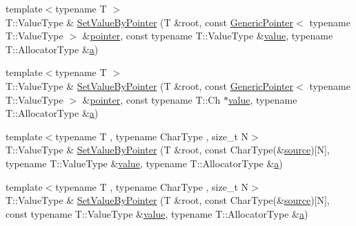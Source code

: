 \begin{DoxyCompactItemize}
\item 
{\footnotesize template$<$typename T $>$ }\\T\+::\+Value\+Type \& \mbox{\hyperlink{namespacerapidjson_a0cd01a20b4256bd943f02fe255e7cc32}{Set\+Value\+By\+Pointer}} (T \&root, const \mbox{\hyperlink{classrapidjson_1_1_generic_pointer}{Generic\+Pointer}}$<$ typename T\+::\+Value\+Type $>$ \&\mbox{\hyperlink{namespacerapidjson_aa5b8c07c8721afe6870a0210820ea19d}{pointer}}, const typename T\+::\+Value\+Type \&\mbox{\hyperlink{namespacerapidjson_a1a75d60792094d496b500c40776030dd}{value}}, typename T\+::\+Allocator\+Type \&\mbox{\hyperlink{namespacerapidjson_a11fce64e721729aaf6be4a485c78f231}{a}})
\item 
{\footnotesize template$<$typename T $>$ }\\T\+::\+Value\+Type \& \mbox{\hyperlink{namespacerapidjson_a03c2d060d62936bab0fe4b89f7205a8d}{Set\+Value\+By\+Pointer}} (T \&root, const \mbox{\hyperlink{classrapidjson_1_1_generic_pointer}{Generic\+Pointer}}$<$ typename T\+::\+Value\+Type $>$ \&\mbox{\hyperlink{namespacerapidjson_aa5b8c07c8721afe6870a0210820ea19d}{pointer}}, const typename T\+::\+Ch $\ast$\mbox{\hyperlink{namespacerapidjson_a1a75d60792094d496b500c40776030dd}{value}}, typename T\+::\+Allocator\+Type \&\mbox{\hyperlink{namespacerapidjson_a11fce64e721729aaf6be4a485c78f231}{a}})
\item 
{\footnotesize template$<$typename T , typename Char\+Type , size\+\_\+t N$>$ }\\T\+::\+Value\+Type \& \mbox{\hyperlink{namespacerapidjson_aeb9fb9b3b5c8377b0155bca9aeb40a51}{Set\+Value\+By\+Pointer}} (T \&root, const Char\+Type(\&\mbox{\hyperlink{namespacerapidjson_a37a3d95ab06aa7542487bb76e704885c}{source}})\mbox{[}N\mbox{]}, typename T\+::\+Value\+Type \&\mbox{\hyperlink{namespacerapidjson_a1a75d60792094d496b500c40776030dd}{value}}, typename T\+::\+Allocator\+Type \&\mbox{\hyperlink{namespacerapidjson_a11fce64e721729aaf6be4a485c78f231}{a}})
\item 
{\footnotesize template$<$typename T , typename Char\+Type , size\+\_\+t N$>$ }\\T\+::\+Value\+Type \& \mbox{\hyperlink{namespacerapidjson_a4c7a1df544ef6745922b7311cbbe98f0}{Set\+Value\+By\+Pointer}} (T \&root, const Char\+Type(\&\mbox{\hyperlink{namespacerapidjson_a37a3d95ab06aa7542487bb76e704885c}{source}})\mbox{[}N\mbox{]}, const typename T\+::\+Value\+Type \&\mbox{\hyperlink{namespacerapidjson_a1a75d60792094d496b500c40776030dd}{value}}, typename T\+::\+Allocator\+Type \&\mbox{\hyperlink{namespacerapidjson_a11fce64e721729aaf6be4a485c78f231}{a}})

\end{DoxyCompactItemize}
